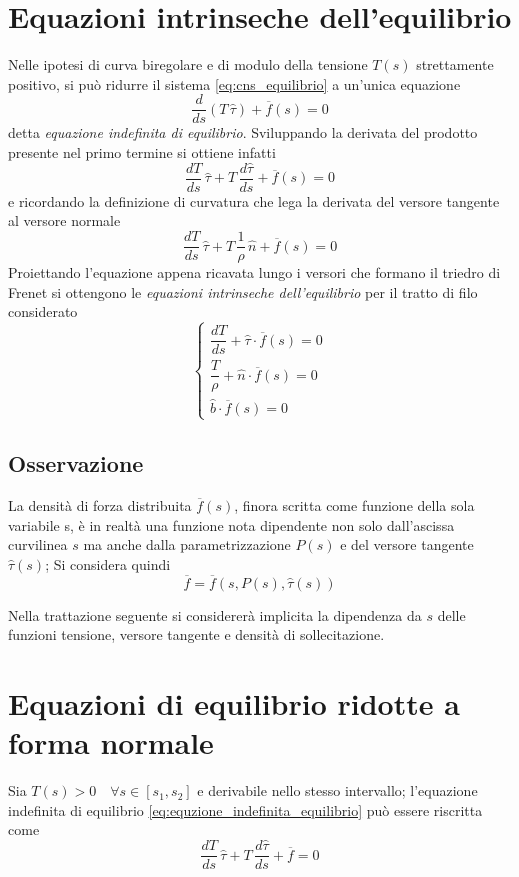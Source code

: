\section{Equazioni intrinseche dell'equilibrio}
Nelle ipotesi di curva biregolare  e di modulo della tensione  $T(s)$ strettamente positivo,  si può ridurre il sistema \eqref{eq:cns_equilibrio} a un'unica equazione
\begin{equation}
	\label{eq:equzione_indefinita_equilibrio}
	\dfrac{d}{ds}(T\,\hat{\tau}) + \overline{f}(s) = 0
\end{equation}
detta \emph{equazione indefinita di equilibrio}. Sviluppando la derivata del prodotto presente nel primo termine si ottiene infatti
\[
	\dfrac{dT}{ds}\,\hat{\tau} + T\,\dfrac{d\hat{\tau}}{ds} + \overline{f}(s) = 0
\]
e ricordando la definizione di curvatura che lega la derivata del versore tangente al versore normale
\[
	\dfrac{dT}{ds}\,\hat{\tau} + T\,\dfrac{1}{\rho}\,\hat{n} + \overline{f}(s) = 0
\]
Proiettando l'equazione appena ricavata lungo i versori che formano il triedro di Frenet si ottengono le \emph{equazioni intrinseche dell'equilibrio} per il tratto di filo considerato
\begin{equation}
	\begin{cases}
		\dfrac{dT}{ds} + \hat{\tau}\cdot \overline{f}(s)=0\\[2ex]
		\dfrac{T}{\rho} + \hat{n}\cdot \overline{f}(s)=0\\[2ex]
		\hat{b}\cdot \overline{f}(s)=0
	\end{cases}
\end{equation}

\subsection*{Osservazione}
La densità di forza distribuita $\overline{f}(s)$, finora scritta come funzione della sola variabile s, è in realtà una funzione nota dipendente non solo dall'ascissa curvilinea $s$ ma anche dalla parametrizzazione $P(s)$ e del versore tangente $\hat{\tau}(s)$; Si considera quindi
\[
\overline{f} = \overline{f}	(s, P(s), \hat{\tau}(s))
\]

Nella trattazione seguente si considererà implicita la dipendenza da $s$ delle funzioni tensione, versore tangente e densità di sollecitazione.

\section{Equazioni di equilibrio ridotte a forma normale}
Sia $T(s)>0\quad\forall s \in[s_1, s_2]$ e derivabile nello stesso intervallo; l'equazione indefinita di equilibrio \eqref{eq:equzione_indefinita_equilibrio} può essere riscritta come
\begin{equation}
	\label{eq:equazione_indefinita_equilibrio_1}
	\dfrac{dT}{ds}\,\hat{\tau} + T\,\dfrac{d\hat{\tau}}{ds}+ \overline{f} = 0
\end{equation}

